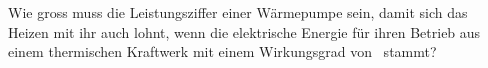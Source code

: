 Wie gross muss die Leistungsziffer einer Wärmepumpe sein, damit sich das Heizen mit ihr auch lohnt, wenn die elektrische Energie für ihren Betrieb aus einem thermischen Kraftwerk mit einem Wirkungsgrad von \etKO\ stammt?

